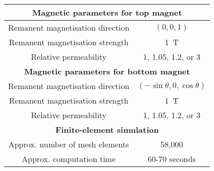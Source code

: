 \begin{table}[h!]
    \centering
    \begin{tabular}{c|c}
        \multicolumn{2}{c}{\textbf{Magnetic parameters for top magnet}} \\ \hline
        Remanent magnetisation direction & \(\left(0,0,1\right)\) \\
        Remanent magnetisation strength & \SI{1}{\tesla} \\
        Relative permeability & 1, 1.05, 1.2, or 3 \\ \hline\hline
        \multicolumn{2}{c}{\textbf{Magnetic parameters for bottom magnet}} \\ \hline
        Remanent magnetisation direction & \(\left(-\sin\theta, 0, \cos\theta\right)\) \\
        Remanent magnetisation strength & \SI{1}{\tesla} \\
        Relative permeability & 1, 1.05, 1.2, or 3 \\ \hline\hline
        \multicolumn{2}{c}{\textbf{Finite-element simulation}} \\ \hline
        Approx. number of mesh elements & 58,000 \\
        Approx. computation time & 60-70 seconds \\ \hline\hline
    \end{tabular}
\end{table}